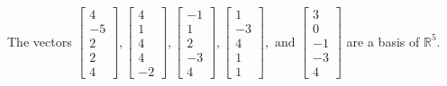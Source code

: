 \begin{exercise}
\begin{exerciseStatement}
  \end{exerciseStatement}
  \begin{exerciseAnswer}
   The vectors \(\left[\begin{array}{r}
4 \\
-5 \\
2 \\
2 \\
4
\end{array}\right] , \left[\begin{array}{r}
4 \\
1 \\
4 \\
4 \\
-2
\end{array}\right] , \left[\begin{array}{r}
-1 \\
1 \\
2 \\
-3 \\
4
\end{array}\right] , \left[\begin{array}{r}
1 \\
-3 \\
4 \\
1 \\
1
\end{array}\right] , \text{ and } \left[\begin{array}{r}
3 \\
0 \\
-1 \\
-3 \\
4
\end{array}\right]\) 
  	 are  a basis of \(\mathbb{R}^5\).
  


  \end{exerciseAnswer}
\end{exercise}